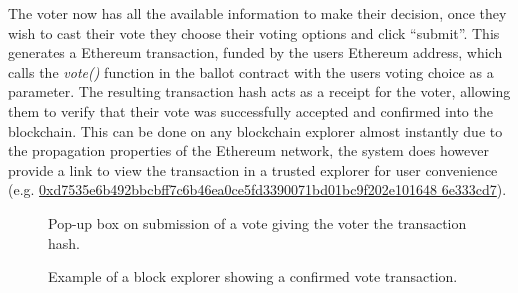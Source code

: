 \documentclass{article}
\begin{document}
The voter now has all the available information to make their decision, once they wish to cast their vote they choose their voting options and click ``submit''. This generates a Ethereum transaction, funded by the users Ethereum address, which calls the \textit{vote()} function in the ballot contract with the users voting choice as a parameter. The resulting transaction hash acts as a receipt for the voter, allowing them to verify that their vote was successfully accepted and confirmed into the blockchain. This can be done on any blockchain explorer almost instantly due to the propagation properties of the Ethereum network, the system does however provide a link to view the transaction in a trusted explorer for user convenience (e.g. \href{https://etherscan.io/tx/0xd7535e6b492bbcbff7c6b46ea0ce5fd3390071bd01bc9f202e1016486e333cd7}{0xd7535e6b492bbcbff7c6b46ea0ce5fd3390071bd01bc9f202e101648
6e333cd7}).

\begin{figure}[h]
	\noindent
	\caption{Pop-up box on submission of a vote giving the voter the transaction hash.}
\end{figure}

\begin{figure}[h]
	\noindent
	\caption{Example of a block explorer showing a confirmed vote transaction.}
\end{figure}
\end{document}
